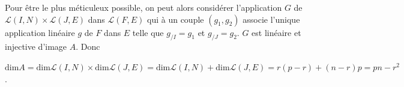 {\begin{enumerate}
{Pour être le plus méticuleux possible, on peut alors considérer l'application $G$ de $\mathcal{L}(I,N)\times\mathcal{L}(J,E)$ dans $\mathcal{L}(F,E)$ qui à un couple $(g_1,g_2)$ associe l'unique application linéaire $g$ de $F$ dans $E$ telle que $g_{/I}= g_1$ et $g_{/J}=g_2$. $G$ est linéaire et injective d'image $A$. Donc 

\begin{center}
$\text{dim}A =\text{dim}\mathcal{L}(I,N)\times\text{dim}\mathcal{L}(J,E)=\text{dim}\mathcal{L}(I,N) + \text{dim}\mathcal{L}(J,E) = r(p - r) + (n - r)p = pn - r^2$.
\end{center}}
\end{enumerate}
}
